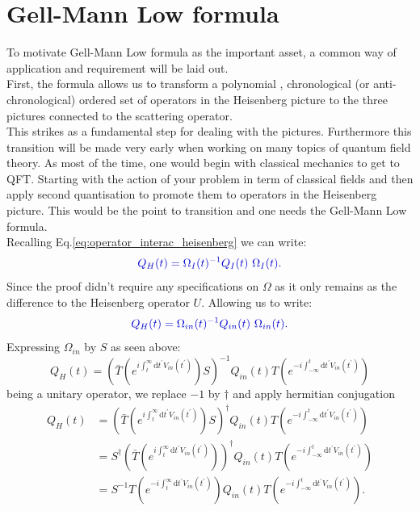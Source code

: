 \documentclass[12pt, titlepage]{article}
\begin{document}
\section{Gell-Mann Low formula}
%
To motivate Gell-Mann Low formula as the important asset, a common way of application and requirement will be laid out. \\
First, the formula allows us to transform a polynomial , chronological (or anti-chronological) ordered set of operators in the Heisenberg picture to  the three pictures connected to the scattering operator. \\
This strikes as a fundamental step for dealing with the pictures. Furthermore this transition will be made very early when working on many topics of quantum field theory. As most of the time, one would begin with classical mechanics to get to QFT. Starting with the action of your problem in term of classical fields and then apply second quantisation to promote them to operators in the Heisenberg picture. This would be the point to transition and one needs the Gell-Mann Low formula.\\
%
Recalling Eq.\eqref{eq:operator_interac_heisenberg} we can write:
\begin{equation}\textcolor[RGB]{0,0,204}{
Q_{H}(t)=\Omega_{I}(t)^{-1}Q_{I}(t)\ \Omega_{I}(t).
}
\end{equation}
Since the proof didn't require any specifications on $ \Omega $ as it only remains as the difference to the Heisenberg operator $ U $. Allowing us to write:
\begin{equation}\textcolor[RGB]{0,0,204}{
Q_{H}(t)=\Omega_{in}(t)^{-1}Q_{in}(t)\ \Omega_{in}(t).
}
\end{equation}
Expressing $ \Omega_{in} $ by $ S $ as seen above:
\begin{equation}
Q_{H}(t)
=\left( 
\bar{T}
\left( 
 e^{i\int_{t}^{\infty}\mathrm{d}t^{\prime} V_{in}(t^{\prime})}
\right) 
S
\right)^{-1}
Q_{in}(t)
T
\left( 
 e^{-i\int_{-\infty}^{t}\mathrm{d}t^{\prime} V_{in}(t^{\prime})}
\right) 
\end{equation}
being a unitary operator, we replace $ -1 $ by $ \dagger $ and apply hermitian conjugation
\begin{subequations}
\begin{align}
Q_{H}(t)
&=\left( 
\bar{T}
\left( 
 e^{i\int_{t}^{\infty}\mathrm{d}t^{\prime} V_{in}(t^{\prime})}
\right) 
S
\right)^{\dagger}
Q_{in}(t)
T
\left( 
 e^{-i\int_{-\infty}^{t}\mathrm{d}t^{\prime} V_{in}(t^{\prime})}
\right) 
\\
&=
S^{\dagger}\left( 
\bar{T}
\left( 
 e^{i\int_{t}^{\infty}\mathrm{d}t^{\prime} V_{in}(t^{\prime})}
\right) 
\right)^{\dagger}
Q_{in}(t)
T
\left( 
 e^{-i\int_{-\infty}^{t}\mathrm{d}t^{\prime} V_{in}(t^{\prime})}
\right) 
\\
&=
S^{-1} 
T
\left( 
 e^{-i\int_{t}^{\infty}\mathrm{d}t^{\prime} V_{in}(t^{\prime})}
\right)
Q_{in}(t)
T
\left( 
 e^{-i\int_{-\infty}^{t}\mathrm{d}t^{\prime} V_{in}(t^{\prime})}
\right) .
\end{align}
\end{subequations}
\end{document}
